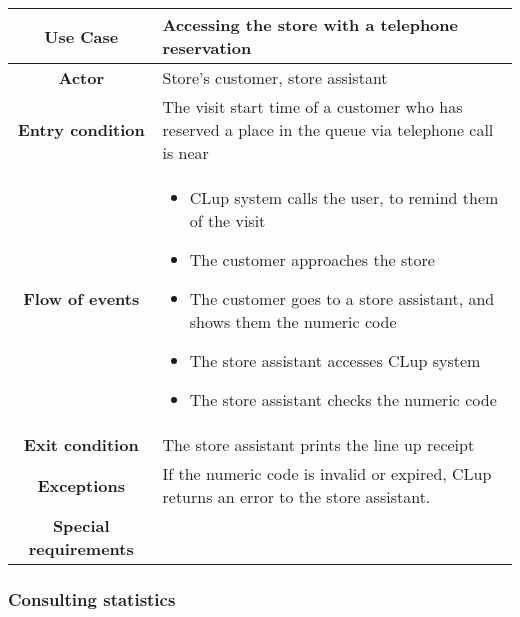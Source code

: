\documentclass[../../main.tex]{subfiles}
\begin{document}
      \begin{table}[H]
        \centering
          \begin{tabular}{c m{}}
          \hline
          \textbf{Use Case} & Accessing the store with a telephone reservation\\ \hline
          \textbf{Actor} & Store's customer, store assistant\\ \hline
          \textbf{Entry condition} & The visit start time of a customer who has reserved a place in the queue via telephone call is near\\  \hline
          \textbf{Flow of events} & \begin{itemize}
                                      \item CLup system calls the user, to remind them of the visit
                                      \item The customer approaches the store
                                      \item The customer goes to a store assistant, and shows them the numeric code
                                      \item The store assistant accesses CLup system
                                      \item The store assistant checks the numeric code
                                    \end{itemize}\\ \hline
          \textbf{Exit condition} & The store assistant prints the line up receipt \\ \hline
          \textbf{Exceptions} & If the numeric code is invalid or expired, CLup returns an error to the store assistant.\\ \hline
          \textbf{Special requirements} &\\ \hline
          \end{tabular}
      \end{table}


      \subsubsection{Consulting statistics} %
\end{document}
